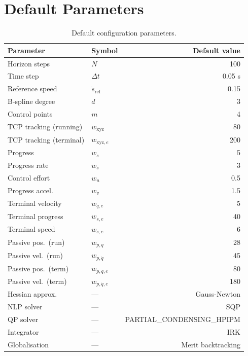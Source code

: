 \documentclass[11pt, a4paper]{article}
\begin{document}
\section{Default Parameters}

\begin{table}[h]
  \centering
  \begin{tabular}{llr}
    \toprule
    Parameter & Symbol & Default value \\
    \midrule
    Horizon steps       & $N$                    & 100 \\
    Time step           & $\Delta t$             & 0.05 s \\
    Reference speed     & $\dot{s}_\mathrm{ref}$ & 0.15 \\
    B-spline degree     & $d$                    & 3 \\
    Control points      & $m$                    & 4 \\
    \midrule
    TCP tracking (running)  & $w_\mathrm{xyz}$   & 80 \\
    TCP tracking (terminal) & $w_{\mathrm{xyz},e}$ & 200 \\
    Progress            & $w_s$                  & 5 \\
    Progress rate       & $w_{\dot{s}}$          & 3 \\
    Control effort      & $w_u$                  & 0.5 \\
    Progress accel.     & $w_v$                  & 1.5 \\
    Terminal velocity   & $w_{\dot{q},e}$        & 5 \\
    Terminal progress   & $w_{s,e}$              & 40 \\
    Terminal speed      & $w_{\dot{s},e}$        & 6 \\
    Passive pos.\ (run) & $w_{p,q}$              & 28 \\
    Passive vel.\ (run) & $w_{p,\dot{q}}$        & 45 \\
    Passive pos.\ (term) & $w_{p,q,e}$           & 80 \\
    Passive vel.\ (term) & $w_{p,\dot{q},e}$     & 180 \\
    \midrule
    Hessian approx.     & —                      & Gauss-Newton \\
    NLP solver          & —                      & SQP \\
    QP solver           & —                      & PARTIAL\_CONDENSING\_HPIPM \\
    Integrator          & —                      & IRK \\
    Globalisation       & —                      & Merit backtracking \\
    \bottomrule
  \end{tabular}
  \caption{Default configuration parameters.}
  \label{tab:defaults}
\end{table}
\end{document}
